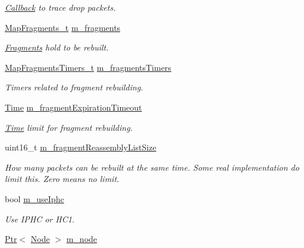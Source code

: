 \begin{DoxyCompactItemize}
\begin{DoxyCompactList}\small\item\em \hyperlink{classns3_1_1Callback}{Callback} to trace drop packets. \end{DoxyCompactList}\item 
\hyperlink{classns3_1_1SixLowPanNetDevice_a382cbc481f6663c889485dfa63f6c5c3}{Map\+Fragments\+\_\+t} \hyperlink{classns3_1_1SixLowPanNetDevice_aed9787c7dcee491945b752d0baa69d09}{m\+\_\+fragments}
\begin{DoxyCompactList}\small\item\em \hyperlink{classns3_1_1SixLowPanNetDevice_1_1Fragments}{Fragments} hold to be rebuilt. \end{DoxyCompactList}\item 
\hyperlink{classns3_1_1SixLowPanNetDevice_a18f45002cd987a2b49d9c155e21d99b7}{Map\+Fragments\+Timers\+\_\+t} \hyperlink{classns3_1_1SixLowPanNetDevice_ac1f25bfd21a90f1419db0ecf1ea82547}{m\+\_\+fragments\+Timers}
\begin{DoxyCompactList}\small\item\em Timers related to fragment rebuilding. \end{DoxyCompactList}\item 
\hyperlink{classns3_1_1Time}{Time} \hyperlink{classns3_1_1SixLowPanNetDevice_ace8f2bb99c947fdaa963d8372467642c}{m\+\_\+fragment\+Expiration\+Timeout}
\begin{DoxyCompactList}\small\item\em \hyperlink{classns3_1_1Time}{Time} limit for fragment rebuilding. \end{DoxyCompactList}\item 
uint16\+\_\+t \hyperlink{classns3_1_1SixLowPanNetDevice_acf2402dc29d4865287993a508b74c855}{m\+\_\+fragment\+Reassembly\+List\+Size}
\begin{DoxyCompactList}\small\item\em How many packets can be rebuilt at the same time. Some real implementation do limit this. Zero means no limit. \end{DoxyCompactList}\item 
bool \hyperlink{classns3_1_1SixLowPanNetDevice_a304a0244019df2ca598b655210d82533}{m\+\_\+use\+Iphc}
\begin{DoxyCompactList}\small\item\em Use I\+P\+HC or H\+C1. \end{DoxyCompactList}\item 
\hyperlink{classns3_1_1Ptr}{Ptr}$<$ \hyperlink{classns3_1_1Node}{Node} $>$ \hyperlink{classns3_1_1SixLowPanNetDevice_a3f287ff63be440ab2978697b1d9b26a5}{m\+\_\+node}

\end{DoxyCompactItemize}
